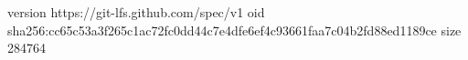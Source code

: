 version https://git-lfs.github.com/spec/v1
oid sha256:cc65c53a3f265c1ac72fc0dd44c7e4dfe6ef4c93661faa7c04b2fd88ed1189ce
size 284764
